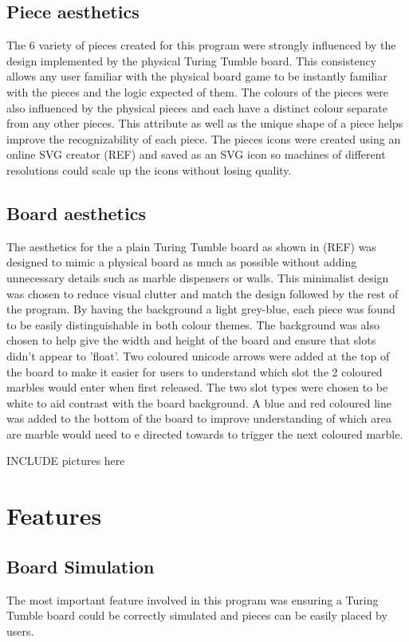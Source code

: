 \documentclass{l4proj}
\begin{document}
\subsection{Piece aesthetics}
The 6 variety of pieces created for this program were strongly influenced by the design implemented by the physical Turing Tumble board. This consistency allows any user familiar with the physical board game to be instantly familiar with the pieces and the logic expected of them. The colours of the pieces were also influenced by the physical pieces and each have a distinct colour separate from any other pieces. This attribute as well as the unique shape of a piece helps improve the recognizability of each piece. The pieces icons were created using an online SVG creator (REF) and saved as an SVG icon so machines of different resolutions could scale up the icons without losing quality. 

\subsection{Board aesthetics}
The aesthetics for the a plain Turing Tumble board as shown in (REF) was designed to mimic a physical board as much as possible without adding unnecessary details such as marble dispensers or walls. This minimalist design was chosen to reduce visual clutter and match the design followed by the rest of the program. By having the background a light grey-blue, each piece was found to be easily distinguishable in both colour themes. The background was also chosen to help give the width and height of the board and ensure that slots didn't appear to 'float'. Two coloured unicode arrows were added at the top of the board to make it easier for users to understand which slot the 2 coloured marbles would enter when first released. The two slot types were chosen to be white to aid contrast with the board background. A blue and red coloured line was added to the bottom of the board to improve understanding of which area are marble would need to e directed towards to trigger the next coloured marble.

INCLUDE pictures here
\section{Features}

\subsection{Board Simulation}
The most important feature involved in this program was ensuring a Turing Tumble board could be correctly simulated and pieces can be easily placed by users. 
\end{document}
